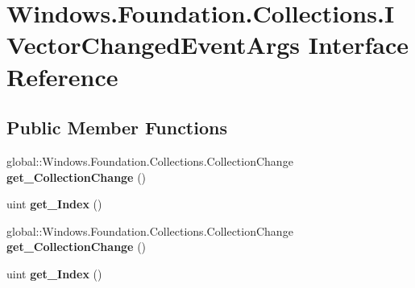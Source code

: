 \hypertarget{interface_windows_1_1_foundation_1_1_collections_1_1_i_vector_changed_event_args}{}\section{Windows.\+Foundation.\+Collections.\+I\+Vector\+Changed\+Event\+Args Interface Reference}
\label{interface_windows_1_1_foundation_1_1_collections_1_1_i_vector_changed_event_args}
\subsection*{Public Member Functions}
\begin{DoxyCompactItemize}
\item 
\mbox{\label{interface_windows_1_1_foundation_1_1_collections_1_1_i_vector_changed_event_args_af7fb52152f8082c4af5d70cca45b3bb6}} 
global\+::\+Windows.\+Foundation.\+Collections.\+Collection\+Change {\bfseries get\+\_\+\+Collection\+Change} ()
\item 
\mbox{\label{interface_windows_1_1_foundation_1_1_collections_1_1_i_vector_changed_event_args_a7d5f41cfbb8fd4ca24e571ab4e56a8a5}} 
uint {\bfseries get\+\_\+\+Index} ()
\item 
\mbox{\label{interface_windows_1_1_foundation_1_1_collections_1_1_i_vector_changed_event_args_af7fb52152f8082c4af5d70cca45b3bb6}} 
global\+::\+Windows.\+Foundation.\+Collections.\+Collection\+Change {\bfseries get\+\_\+\+Collection\+Change} ()
\item 
\mbox{\label{interface_windows_1_1_foundation_1_1_collections_1_1_i_vector_changed_event_args_a7d5f41cfbb8fd4ca24e571ab4e56a8a5}} 
uint {\bfseries get\+\_\+\+Index} ()
\item 
\mbox{\label{interface_windows_1_1_foundation_1_1_collections_1_1_i_vector_changed_event_args_af7fb52152f8082c4af5d70cca45b3bb6}} 

\end{DoxyCompactItemize}
